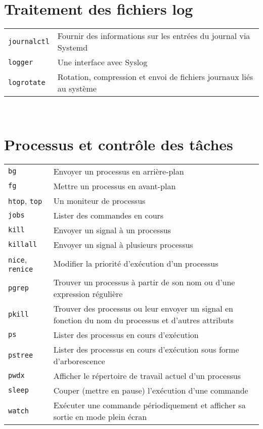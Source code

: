 \documentclass[10pt,a4paper]{article}
\begin{document}
\begin{multicols}{2}   

\section{Traitement des fichiers log}
\begin{tabular}{ p{2.5cm} p{8.5cm} }
  \hline
  \texttt{journalctl} & Fournir des informations sur les entrées du journal via Systemd \\
  \rowcolor{Gray}
  \texttt{logger} & Une interface avec Syslog \\
  \texttt{logrotate} & Rotation, compression et envoi de fichiers journaux liés au système \\
  \hline
\end{tabular}

~ \\
\vfill

\section{Processus et contrôle des tâches}
\begin{tabular}{ p{2.5cm} p{8.5cm} }
  \hline
  \texttt{bg} & Envoyer un processus en arrière-plan \\
  \rowcolor{Gray}
  \texttt{fg} & Mettre un processus en avant-plan \\
  \texttt{htop}, \texttt{top} & Un moniteur de processus \\
  \rowcolor{Gray}
  \texttt{jobs} & Lister des commandes en cours \\
  \texttt{kill} & Envoyer un signal à un processus \\
  \rowcolor{Gray}
  \texttt{killall} & Envoyer un signal à plusieurs processus\\
  \texttt{nice}, \texttt{renice} & Modifier la priorité d'exécution d'un processus \\
  \rowcolor{Gray}
  \texttt{pgrep} & Trouver un processus à partir de son nom ou d'une expression régulière \\
  \texttt{pkill} & Trouver des processus ou leur envoyer un signal en fonction du nom du processus et d'autres attributs\\
  \rowcolor{Gray}
  \texttt{ps} & Lister des processus en cours d'exécution \\
  \texttt{pstree} & Lister des processus en cours d'exécution sous forme d'arborescence \\
  \rowcolor{Gray}
  \texttt{pwdx} & Afficher le répertoire de travail actuel d'un processus \\
  \texttt{sleep} & Couper (mettre en pause) l'exécution d'une commande\\
  \rowcolor{Gray}
  \texttt{watch} & Exécuter une commande périodiquement et afficher sa sortie en mode plein écran \\
  \hline
\end{tabular}


\end{multicols}
\end{document}
